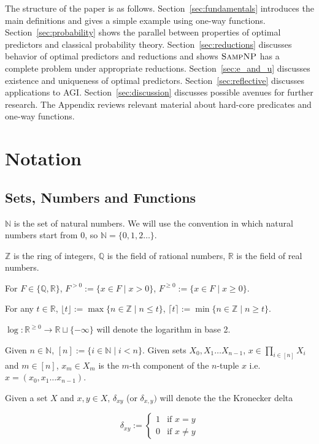 \documentclass{article}
\numberwithin{equation}{section}
\theoremstyle{definition}
\theoremstyle{plain}
\newcommand{\Nats}{\mathbb{N}}
\newcommand{\Ints}{\mathbb{Z}}
\newcommand{\Rats}{\mathbb{Q}}
\newcommand{\Reals}{\mathbb{R}}
\newcommand{\Floor}[1]{\lfloor #1 \rfloor}
\newcommand{\Ceil}[1]{\lceil #1 \rceil}
\begin{document}
The structure of the paper is as follows. Section~\ref{sec:fundamentals} introduces the main definitions and gives a simple example using one-way functions. Section~\ref{sec:probability} shows the parallel between properties of optimal predictors and classical probability theory. Section~\ref{sec:reductions} discusses behavior of optimal predictors and reductions and shows $\textsc{SampNP}$ has a complete problem under appropriate reductions. Section~\ref{sec:e_and_u} discusses existence and uniqueness of optimal predictors. Section~\ref{sec:reflective} discusses applications to AGI. Section~\ref{sec:discussion} discusses possible avenues for further research. The Appendix reviews relevant material about hard-core predicates and one-way functions.

\setcounter{section}{-1}

\section{Notation}
%
\subsection{Sets, Numbers and Functions}

$\Nats$ is the set of natural numbers. We will use the convention in which natural numbers start from 0, so $\Nats = \{0, 1, 2 \ldots \}$. 

$\Ints$ is the ring of integers, $\Rats$ is the field of rational numbers, $\Reals$ is the field of real numbers.

For $F \in \{\Rats,\Reals\}$, $F^{>0} := \{x \in F \mid x > 0\}$, $F^{\geq 0} := \{x \in F \mid x \geq 0\}$.

For any $t \in \Reals$, $\Floor{t} := \max \{n \in \Ints \mid n \leq t\}$, $\Ceil{t} := \min \{n \in \Ints \mid n \geq t\}$.

$\log: \Reals^{\geq 0} \rightarrow \Reals \sqcup \{-\infty\}$ will denote the logarithm in base 2.

Given $n \in \Nats$, $[n]:=\{i \in \Nats \mid i < n\}$. Given sets $X_0, X_1 \ldots X_{n-1}$, ${x \in \prod_{i \in [n]} X_i}$ and $m \in [n]$, $x_m \in X_m$ is the $m$-th component of the $n$-tuple $x$ i.e. ${x=(x_0, x_1 \ldots x_{n-1})}$.

Given a set $X$ and $x,y \in X$, $\delta_{xy}$ (or $\delta_{x,y})$ will denote the the Kronecker delta

$$\delta_{xy} := \begin{cases}1 & \text{if } x=y \\ 0 & \text{if } x \ne y \end{cases}$$
\end{document}
